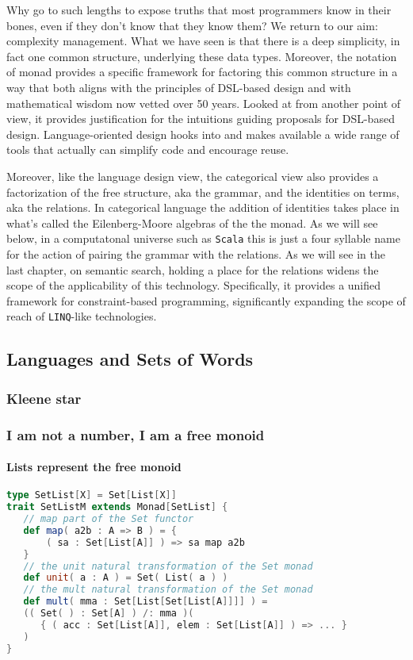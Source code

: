 Why go to such lengths to expose truths that most programmers know in
their bones, even if they don't know that they know them? We return to
our aim: complexity management. What we have seen is that there is a
deep simplicity, in fact one common structure, underlying these data
types. Moreover, the notation of monad provides a specific framework
for factoring this common structure in a way that both aligns with the
principles of DSL-based design and with mathematical wisdom now vetted
over 50 years. Looked at from another point of view, it provides
justification for the intuitions guiding proposals for DSL-based
design. Language-oriented design hooks into and makes available a wide
range of tools that actually can simplify code and encourage reuse.

Moreover, like the language design view, the categorical view also
provides a factorization of the free structure, aka the grammar, and
the identities on terms, aka the relations. In categorical language
the addition of identities takes place in what's called the
Eilenberg-Moore algebras of the the monad. As we will see below, in a
computatonal universe such as \texttt{Scala} this is just a four
syllable name for the action of pairing the grammar with the
relations. As we will see in the last chapter, on semantic search,
holding a place for the relations widens the scope of the
applicability of this technology. Specifically, it provides a unified
framework for constraint-based programming, significantly expanding
the scope of reach of \texttt{LINQ}-like technologies.

\subsection{Languages and Sets of Words}

\subsubsection{Kleene star}

\subsubsection{I am not a number, I am a free monoid}

\paragraph{Lists represent the free monoid}

\begin{lstlisting}[language=Scala,mathescape=true]
type SetList[X] = Set[List[X]]
trait SetListM extends Monad[SetList] {
   // map part of the Set functor
   def map( a2b : A => B ) = {
       ( sa : Set[List[A]] ) => sa map a2b
   }
   // the unit natural transformation of the Set monad
   def unit( a : A ) = Set( List( a ) )
   // the mult natural transformation of the Set monad
   def mult( mma : Set[List[Set[List[A]]]] ) =
   (( Set( ) : Set[A] ) /: mma )(
      { ( acc : Set[List[A]], elem : Set[List[A]] ) => ... }
   )
}
\end{lstlisting}

